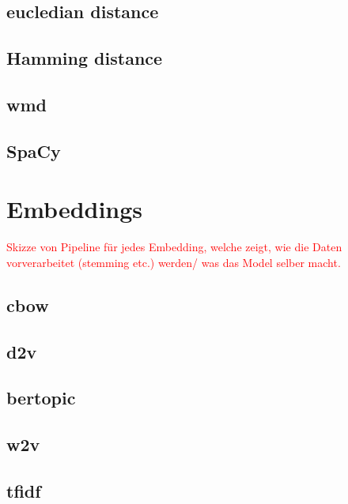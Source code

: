 \subsection{eucledian distance}\label{subsec:eucledian-distance}

\subsection{Hamming distance}\label{subsec:hamming-distance}

\subsection{\ac{wmd}}\label{subsec:word-mover-distance}

\subsection{SpaCy}\label{subsec:spacy}


\section{Embeddings}\label{sec:embeddings}

\textcolor{red}{Skizze von Pipeline für jedes Embedding, welche zeigt, wie die Daten vorverarbeitet (stemming etc.) werden/ was das Model selber macht.}

\subsection{\ac{cbow}}\label{subsec:bag-of-words}

\subsection{\ac{d2v}}\label{subsec:doc2vec}

\subsection{\ac{bertopic}}\label{subsec:bertopic}

\subsection{\ac{w2v}}\label{subsec:word2vec}

\subsection{\ac{tfidf}}\label{subsec:tfidf}

